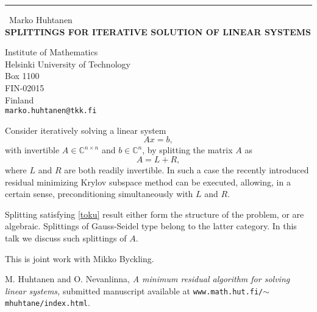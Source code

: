 \documentclass{report}
\begin{document}
\begin{center}
\rule{6in}{1pt} \
{\large Marko Huhtanen \\
{\bf SPLITTINGS FOR ITERATIVE SOLUTION OF LINEAR SYSTEMS}}

Institute of Mathematics \\ Helsinki University of Technology \\ Box 1100 \\ FIN-02015 \\ Finland
\\
{\tt marko.huhtanen@tkk.fi}\end{center}

\def\setC{\mathbb{C}}

Consider iteratively solving
a linear system
\begin{equation}\label{eku}
Ax=b,
\end{equation}
with invertible $A\in \setC^{n \times n}$ and $b\in \setC^n$,
by splitting the matrix $A$ as
\begin{equation}\label{toku}
A=L+R,
\end{equation}
where $L$ and $R$ are both readily invertible.
In such a case the recently introduced residual minimizing
Krylov subspace method \cite{HN} can be executed, allowing,
in a certain sense, preconditioning simultaneously with $L$ and $R$.

Splitting satisfying \eqref{toku} result either form
the structure of the problem, or are algebraic.
Splittings of Gauss-Seidel type belong to the latter category.
In this talk we discuss such splittings of $A$.

\medskip
This is joint work with Mikko Byckling.

\begin{thebibliography}{1}
 {\sc M. Huhtanen and O. Nevanlinna}, {\em A minimum residual
algorithm for solving linear systems,} submitted manuscript available at
\texttt{www.math.hut.fi/$\sim$mhuhtane/index.html}.
\end{thebibliography}
\end{document}
